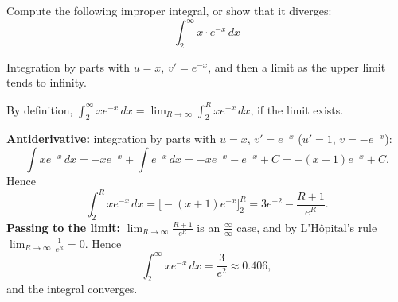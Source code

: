 
\begin{question}
Compute the following improper integral, or show that it diverges:
\[ \int_2^\infty x\cdot e^{-x}\,dx \]
\end{question}

\begin{hint}
Integration by parts with $u=x$, $v'=e^{-x}$, and then a limit as the upper limit tends to infinity.
\end{hint}

\begin{solution}
By definition, $\int_2^\infty xe^{-x}\,dx=\lim_{R\to\infty}\int_2^Rxe^{-x}\,dx$, if the limit exists.

\textbf{Antiderivative:} integration by parts with $u=x$, $v'=e^{-x}$ ($u'=1$, $v=-e^{-x}$):
\[ \int xe^{-x}\,dx=-xe^{-x}+\int e^{-x}\,dx=-xe^{-x}-e^{-x}+C=-(x+1)e^{-x}+C. \]
Hence
\[ \int_2^Rxe^{-x}\,dx=\Big[-(x+1)e^{-x}\Big]_2^R=3e^{-2}-\frac{R+1}{e^R}. \]
\textbf{Passing to the limit:} $\lim_{R\to\infty}\frac{R+1}{e^R}$ is an $\frac\infty\infty$ case, and by L'Hôpital's rule $\lim_{R\to\infty}\frac{1}{e^R}=0$. Hence
\[ \int_2^\infty xe^{-x}\,dx=\boxed{\frac{3}{e^2}}\approx0.406, \]
and the integral converges.
\end{solution}
